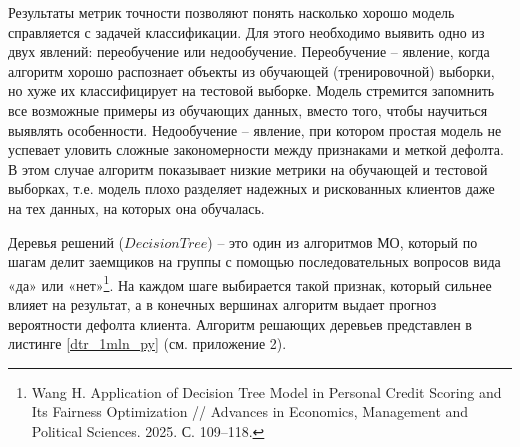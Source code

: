 Результаты метрик точности позволяют понять насколько хорошо модель справляется с задачей классификации. Для этого необходимо выявить одно из двух явлений: переобучение или недообучение. Переобучение -- явление, когда алгоритм хорошо распознает объекты из обучающей (тренировочной) выборки, но хуже их классифицирует на тестовой выборке. Модель стремится запомнить все возможные примеры из обучающих данных, вместо того, чтобы научиться выявлять особенности. Недообучение -- явление, при котором простая модель не успевает уловить сложные закономерности между признаками и меткой дефолта. В этом случае алгоритм показывает низкие метрики на обучающей и тестовой выборках, т.е. модель плохо разделяет надежных и рискованных клиентов даже на тех данных, на которых она обучалась.

Деревья решений ($Decision Tree$) -- это один из алгоритмов МО, который по шагам делит заемщиков на группы с помощью последовательных вопросов вида «да» или «нет»\footnote{Wang H. Application of Decision Tree Model in Personal Credit Scoring and Its Fairness Optimization // Advances in Economics, Management and Political Sciences. 2025. С. 109--118.}. На каждом шаге выбирается такой признак, который сильнее влияет на результат, а в конечных вершинах алгоритм выдает прогноз вероятности дефолта клиента. Алгоритм решающих деревьев представлен в листинге \ref{dtr_1mln_py} (см. приложение 2).

